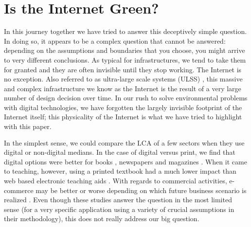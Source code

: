 \documentclass{article}
\begin{document}
\cleardoublepage
\section{Is the Internet Green?} \label{SECTION_DISCUSSION}

In this journey together we have tried to answer this deceptively simple question. In doing so, it appears to be a complex question that cannot be answered: depending on the assumptions and boundaries that you choose, you might arrive to very different conclusions. As typical for infrastructures, we tend to take them for granted and they are often invisible until they stop working. The Internet is no exception. Also referred to as ultra-large scale systems (ULSS) \cite{northrop2006ultra}, this massive and complex infrastructure we know as the Internet is the result of a very large number of design decision over time. In our rush to solve environmental problems with digital technologies, we have forgotten the largely invisible footprint of the Internet itself; this physicality of the Internet is what we have tried to highlight with this paper.

In the simplest sense, we could compare the LCA of a few sectors when they use digital or non-digital medians. In the case of digital versus print, we find that digital options were better for books \cite{bull2014comparative}, newspapers \cite{moberg2010printed} and magazines \cite{ahmadi2015life}. When it came to teaching, however, using a printed textbook had a much lower impact than web based electronic teaching aids \cite{enroth2009environmental}. With regards to commercial activities, e-commerce may be better or worse depending on which future business scenario is realized \cite{caudill2000lifecycle}. Even though these studies answer the question in the most limited sense (for a very specific application using a variety of crucial assumptions in their methodology), this does not really address our big question. 
\end{document}
